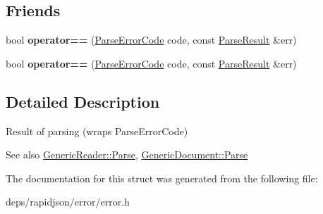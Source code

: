 \subsection*{Friends}
\begin{DoxyCompactItemize}
\item 
bool {\bfseries operator==} (\hyperlink{group___r_a_p_i_d_j_s_o_n___e_r_r_o_r_s_ga8d4b32dfc45840bca189ade2bbcb6ba7}{Parse\+Error\+Code} code, const \hyperlink{struct_parse_result}{Parse\+Result} \&err)\hypertarget{struct_parse_result_a58c9982e833d1c74686506ac7449200c}{}\label{struct_parse_result_a58c9982e833d1c74686506ac7449200c}

\item 
bool {\bfseries operator==} (\hyperlink{group___r_a_p_i_d_j_s_o_n___e_r_r_o_r_s_ga8d4b32dfc45840bca189ade2bbcb6ba7}{Parse\+Error\+Code} code, const \hyperlink{struct_parse_result}{Parse\+Result} \&err)\hypertarget{struct_parse_result_a58c9982e833d1c74686506ac7449200c}{}\label{struct_parse_result_a58c9982e833d1c74686506ac7449200c}

\end{DoxyCompactItemize}


\subsection{Detailed Description}
Result of parsing (wraps Parse\+Error\+Code) 


 \begin{DoxySeeAlso}{See also}
\hyperlink{class_generic_reader_a0c450620d14ff1824e58bb7bd9b42099}{Generic\+Reader\+::\+Parse}, \hyperlink{class_generic_document_aadee36db7064cc9894a75c848831cdae}{Generic\+Document\+::\+Parse} 
\end{DoxySeeAlso}


The documentation for this struct was generated from the following file\+:\begin{DoxyCompactItemize}
\item 
deps/rapidjson/error/error.\+h\end{DoxyCompactItemize}

